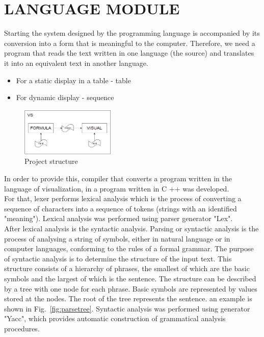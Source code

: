 \documentclass[a4paper, 10pt, conference]{ieeeconf}
\begin{document}
\section{LANGUAGE MODULE}
Starting the system designed by the programming language is accompanied by its conversion into a form that is meaningful to the computer. Therefore, we need a program that reads the text written in one language (the source) and translates it into an equivalent text in another language.\\
\begin{itemize}
\item For a static display in a table - table
\item For dynamic display - sequence
\end{itemize}
\begin{figure}[h]
    \centering
    \includegraphics[width=0.4\textwidth]{structure.png}
    \caption{Project structure}
    \label{fig:structure}
\end{figure}
In order to provide this, compiler that converts a program written in the language of visualization, in a program written in C ++ was developed.\\
For that, lexer performs lexical analysis which is the process of converting a sequence of characters  into a sequence of tokens (strings with an identified "meaning"). Lexical analysis was performed using parser generator "Lex".\\
After lexical analysis is the syntactic analysis. Parsing or syntactic analysis is the process of analysing a string of symbols, either in natural language or in computer languages, conforming to the rules of a formal grammar. The purpose of syntactic analysis is to determine the structure of the input text. This structure consists of a hierarchy of phrases, the smallest of which are the basic symbols and the largest of which is the sentence. The structure can be described by a tree with one node for each phrase. Basic symbols are represented by values stored at the nodes. The root of the tree represents the sentence. an example is shown in Fig.~\ref{fig:parsetree}. Syntactic analysis was performed using generator "Yacc", which provides automatic construction of grammatical analysis procedures.\\
\end{document}
